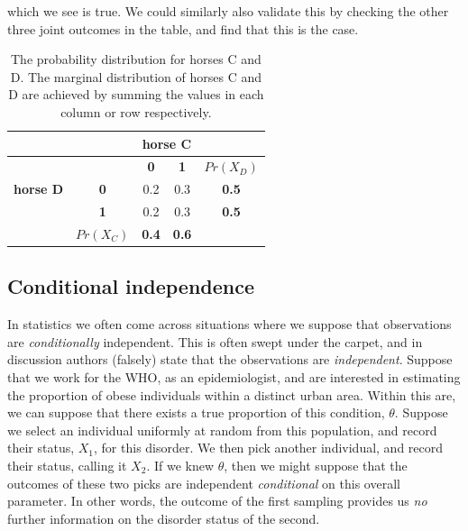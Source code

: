 \documentclass[11pt,fullpage]{book}
\begin{document}
which we see is true. We could similarly also validate this by checking the other three joint outcomes in the table, and find that this is the case.

\begin{table}[htbp]
  \centering
    \begin{tabular}{rrccr}
    \toprule
          &       & \multicolumn{2}{c}{\textbf{horse C}} &  \\
    \midrule
          &       & \textbf{0} & \textbf{1} & \multicolumn{1}{c}{\textbf{$Pr(X_D)$}} \\
    \multicolumn{1}{c}{\textbf{horse D}} & \multicolumn{1}{c}{\textbf{0}} & 0.2   & 0.3   & \multicolumn{1}{c}{\textbf{0.5}} \\
    \multicolumn{1}{c}{} & \multicolumn{1}{c}{\textbf{1}} & 0.2   & 0.3   & \multicolumn{1}{c}{\textbf{0.5}} \\
          & \multicolumn{1}{c}{\textbf{$Pr(X_C)$}} & \textbf{0.4} & \textbf{0.6} & \multicolumn{1}{c}{} \\
    \bottomrule
    \end{tabular}%
  \caption{The probability distribution for horses C and D. The marginal distribution of horses C and D are achieved by summing the values in each column or row respectively.}\label{tab:Probability_horsesIndependent}%
\end{table}%

\subsection{Conditional independence}\label{sec:Probability_conditionalIndependence}
In statistics we often come across situations where we suppose that observations are \textit{conditionally} independent. This is often swept under the carpet, and in discussion authors (falsely) state that the observations are \textit{independent}. Suppose that we work for the WHO, as an epidemiologist, and are interested in estimating the proportion of obese individuals within a distinct urban area. Within this are, we can suppose that there exists a true proportion of this condition, $\theta$. Suppose we select an individual uniformly at random from this population, and record their status, $X_1$, for this disorder. We then pick another individual, and record their status, calling it $X_2$. If we knew $\theta$, then we might suppose that the outcomes of these two picks are independent \textit{conditional} on this overall parameter. In other words, the outcome of the first sampling provides us \textit{no} further information on the disorder status of the second.
\end{document}
